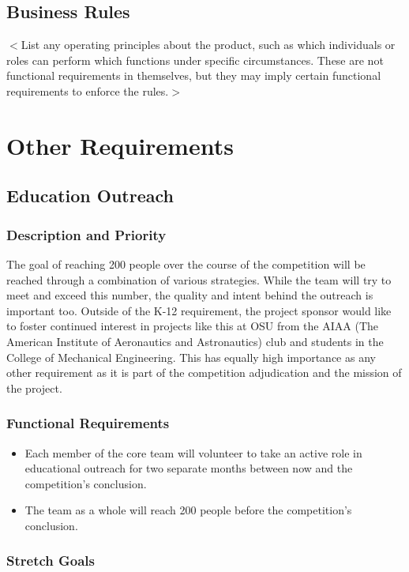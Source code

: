 \documentclass{scrreprt}
\begin{document}
\section{Business Rules}
$<$List any operating principles about the product, such as which individuals or 
roles can perform which functions under specific circumstances. These are not 
functional requirements in themselves, but they may imply certain functional 
requirements to enforce the rules.$>$


\chapter{Other Requirements}
\section{Education Outreach}
\subsection{Description and Priority}
The goal of reaching 200 people over the course of the competition will be reached through a combination of various strategies. While the team will try to meet and exceed this number, the quality and intent behind the outreach is important too. Outside of the K-12 requirement, the project sponsor would like to foster continued interest in projects like this at OSU from the AIAA (The American Institute of Aeronautics and Astronautics) club and students in the College of Mechanical Engineering. This has equally high importance as any other requirement as it is part of the competition adjudication and the mission of the project. 

\subsection{Functional Requirements}
\begin{itemize}
\item Each member of the core team will volunteer to take an active role in educational outreach for two separate months between now and the competition's conclusion.
\item The team as a whole will reach 200 people before the competition's conclusion.
\end{itemize}
\subsection{Stretch Goals}
\end{document}
